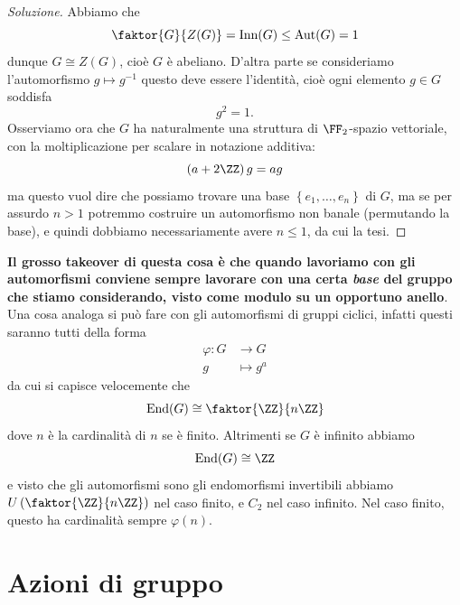 \documentclass[11pt]{scrartcl}
\begin{document}
	\begin{proof}[Soluzione]
		Abbiamo che 
		$$\faktor{G}{Z(G)}=\text{Inn}(G)\le \text{Aut}(G)=1$$
		dunque $G\cong Z(G)$, cioè $G$ è abeliano. D'altra parte se consideriamo l'automorfismo $g\mapsto g^{-1}$ questo deve essere l'identità, cioè ogni elemento $g\in G$ soddisfa
		$$g^2=1.$$
		Osserviamo ora che $G$ ha naturalmente una struttura di $\FF_2$-spazio vettoriale, con la moltiplicazione per scalare in notazione additiva:
		$$\left(a+2\ZZ\right)g=ag$$ 
		ma questo vuol dire che possiamo trovare una base $\left\{e_1,\dots,e_n\right\}$ di $G$, ma se per assurdo $n>1$ potremmo costruire un automorfismo non banale (permutando la base), e quindi dobbiamo necessariamente avere $n\le 1$, da cui la tesi.
	\end{proof}
	\textbf{Il grosso takeover di questa cosa è che quando lavoriamo con gli automorfismi conviene sempre lavorare con una certa \textit{base} del gruppo che stiamo considerando, visto come modulo su un opportuno anello}. Una cosa analoga si può fare con gli automorfismi di gruppi ciclici, infatti questi saranno tutti della forma
	\begin{align*}
		\varphi: G & \to G \\
		g & \mapsto g^a
	\end{align*}	
	da cui si capisce velocemente che 
	$$\text{End}(G)\cong \faktor{\ZZ}{n\ZZ}$$
	dove $n$ è la cardinalità di $n$ se è finito. Altrimenti se $G$ è infinito abbiamo
	$$\text{End}(G)\cong \ZZ$$
	e visto che gli automorfismi sono gli endomorfismi invertibili abbiamo $U\left(\faktor{\ZZ}{n\ZZ}\right)$ nel caso finito, e $C_2$ nel caso infinito. Nel caso finito, questo ha cardinalità sempre $\varphi(n)$.
	
	\newpage
	
	\section{Azioni di gruppo}
	
\end{document}
